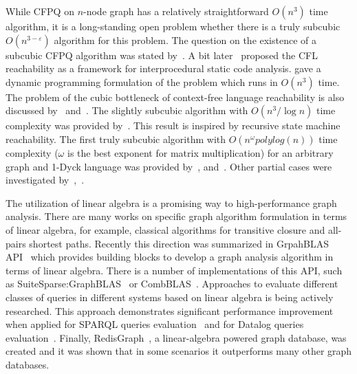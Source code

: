 While CFPQ on $n$-node graph has a relatively straightforward $O(n^3)$ time algorithm, it is a long-standing open problem whether there is a truly  subcubic $O(n^{3-\varepsilon})$ algorithm for this problem.
The question on the existence of a subcubic CFPQ algorithm was stated by~\cite{Yannakakis}.
A bit later~\cite{10.5555/271338.271343} proposed the CFL reachability as a framework for interprocedural static code analysis.
\cite{10.1145/258993.259006} gave a dynamic programming formulation of the problem which runs in $O(n^3)$ time.
The problem of the cubic bottleneck of context-free language reachability is also discussed by~\cite{10.5555/788019.788876} and~\cite{10.1145/258993.259006}.
The slightly subcubic algorithm with $O(n^3/\log{n})$ time complexity was provided by~\cite{10.1145/1328438.1328460}.
This result is inspired by recursive state machine reachability.
The first truly subcubic algorithm with $O(n^\omega polylog(n))$ time complexity ($\omega$ is the best exponent for matrix multiplication) for an arbitrary graph and 1-Dyck language was provided by~\cite{8249039}, and~\cite{pavlogiannis2020finegrained}.
Other partial cases were investigated by~\cite{10.1145/3158118},~\cite{zhang2020conditional}.

The utilization of linear algebra is a promising way to high-performance graph analysis.
There are many works on specific graph algorithm formulation in terms of linear algebra, for example, classical algorithms for transitive closure and all-pairs shortest paths.
Recently this direction was summarized in GrpahBLAS API~\citep{7761646} which provides building blocks to develop a graph analysis algorithm in terms of linear algebra.
There is a number of implementations of this API, such as SuiteSparse:GraphBLAS~\citep{10.1145/3322125} or CombBLAS~\citep{10.1177/1094342011403516}.
Approaches to evaluate different classes of queries in different systems based on linear algebra is being actively researched.
This approach demonstrates significant performance improvement when applied for SPARQL queries evaluation~\citep{10.1145/3302424.3303962,DBLP:journals/corr/MetzlerM15a} and for Datalog queries evaluation~\citep{sato_2017}.
Finally, RedisGraph~\citep{8778293}, a linear-algebra powered graph database, was created and it was shown that in some scenarios it outperforms many other graph databases.